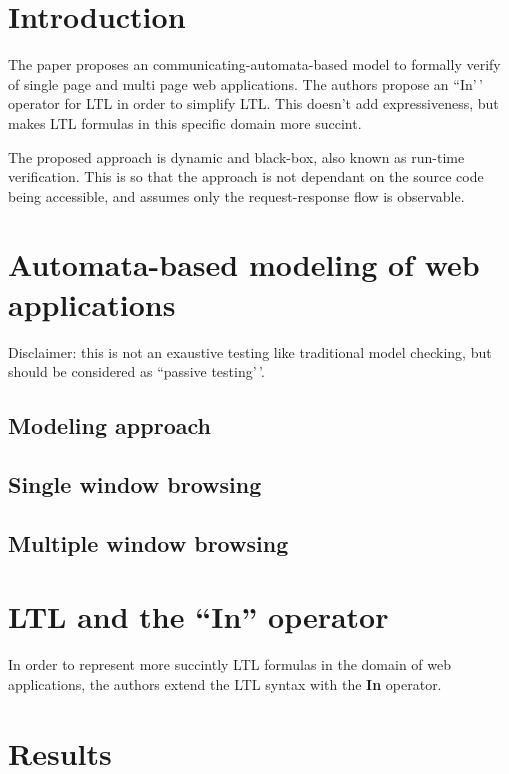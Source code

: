 \documentclass[a4paper,11pt]{report}
\begin{document}
\section{Introduction}
\label{introduction}

The paper proposes an communicating-automata-based model to formally
verify of single page and multi page web applications. The authors
propose an ``In'\,' operator for LTL in order to simplify LTL. This
doesn't add expressiveness, but makes LTL formulas in this specific
domain more succint.

The proposed approach is dynamic and black-box, also known as run-time
verification. This is so that the approach is not dependant on the
source code being accessible, and assumes only the request-response flow
is observable.

\section{Automata-based modeling of web applications}
\label{automata-based-modeling-of-web-applications}

Disclaimer: this is not an exaustive testing like traditional model
checking, but should be considered as ``passive testing'\,'.

\subsection{Modeling approach}
\label{modeling-approach}

\subsection{Single window browsing}
\label{single-window-browsing}

\subsection{Multiple window browsing}
\label{multiple-window-browsing}

\section{LTL and the ``In'' operator}
\label{ltl-and-the-in-operator}

In order to represent more succintly LTL formulas in the domain of web
applications, the authors extend the LTL syntax with the \textbf{In}
operator.

\section{Results}
\label{results}
\end{document}
